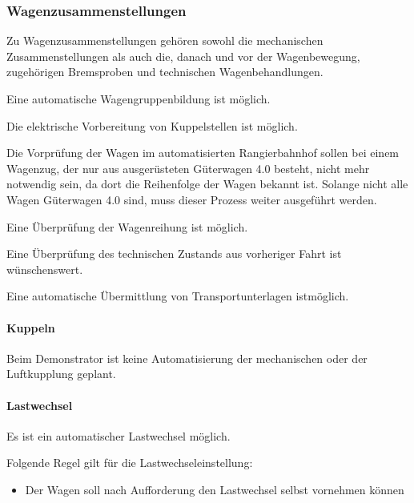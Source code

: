 \subsubsection{Wagenzusammenstellungen}
Zu Wagenzusammenstellungen gehören sowohl die mechanischen Zusammenstellungen als auch die, danach und vor der Wagenbewegung, zugehörigen Bremsproben und technischen Wagenbehandlungen.
\begin{feat}
Eine automatische Wagengruppenbildung ist möglich.
\end{feat}
\begin{feat}
Die elektrische Vorbereitung von Kuppelstellen ist möglich.
\end{feat}
Die Vorprüfung der Wagen im automatisierten Rangierbahnhof sollen bei einem Wagenzug, der nur aus ausgerüsteten Güterwagen 4.0 besteht, nicht mehr notwendig sein, da dort die Reihenfolge der Wagen bekannt ist. Solange nicht alle Wagen Güterwagen 4.0 sind, muss dieser Prozess weiter ausgeführt werden.
\begin{feat}
Eine Überprüfung der Wagenreihung ist möglich.
\end{feat}
\begin{feat}
Eine Überprüfung des technischen Zustands aus vorheriger Fahrt ist wünschenswert.
\end{feat}
\begin{feat}
Eine automatische Übermittlung von Transportunterlagen ist\newline möglich.
\end{feat}

\paragraph{Kuppeln}
Beim Demonstrator ist keine Automatisierung der mechanischen oder der Luftkupplung geplant.

\paragraph{Lastwechsel}
\begin{feat}
Es ist ein automatischer Lastwechsel möglich.
\end{feat}
\begin{rem} [zu Anf. 27]
Folgende Regel gilt für die Lastwechseleinstellung:
\begin{itemize}
    \item Der Wagen soll nach Aufforderung den Lastwechsel selbst vornehmen können
\end{itemize}
\end{rem}


